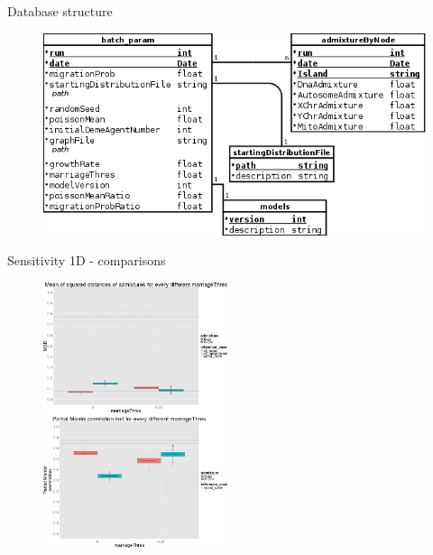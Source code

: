 \documentclass[10pt, aspectratio=43]{beamer}
\begin{document}
\begin{frame}{}{Database structure}
\begin{figure}
  \includegraphics[width=1\textwidth]{../data/DB.png}
\end{figure}
\end{frame}

\begin{frame}{}{Sensitivity 1D - comparisons}
\begin{figure}
  \includegraphics[width=0.48\textwidth]{../data/sensit-comp-1d.png}
\end{figure}
\end{frame}
\end{document}
